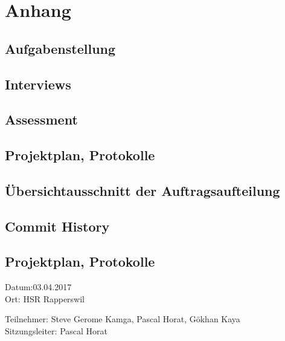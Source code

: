 \chapter*{Anhang}
\label{sec:Anhang}

\section*{Aufgabenstellung}

\section*{Interviews}

\section*{Assessment}

\section*{Projektplan, Protokolle}

\section*{Übersichtausschnitt der Auftragsaufteilung}

\section*{Commit History}







\section*{Projektplan, Protokolle}

Datum:03.04.2017\\
Ort: HSR Rapperswil

Teilnehmer: Steve Gerome Kamga, Pascal Horat, Gökhan Kaya\\
Sitzungsleiter: Pascal Horat

